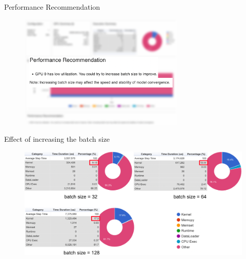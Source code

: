 \documentclass[compress,aspectratio=169]{beamer}
\begin{document}
\begin{frame}{Performance Recommendation}

\begin{center}
    \begin{figure}
        \includegraphics[width=0.7\textwidth]{./assets/scap_gtx1080_profiler-torch_14650076_zoom}
    \end{figure}
\end{center}

\end{frame}


\begin{frame}{Effect of increasing the batch size}
    \vspace{-0.5em}
\begin{center}
    \begin{figure}
        \includegraphics[width=1\textwidth]{./assets/scap_gtx1080_profiler-torch_comparison-batch-size}
    \end{figure}
    \end{center}

\end{frame}
\end{document}
